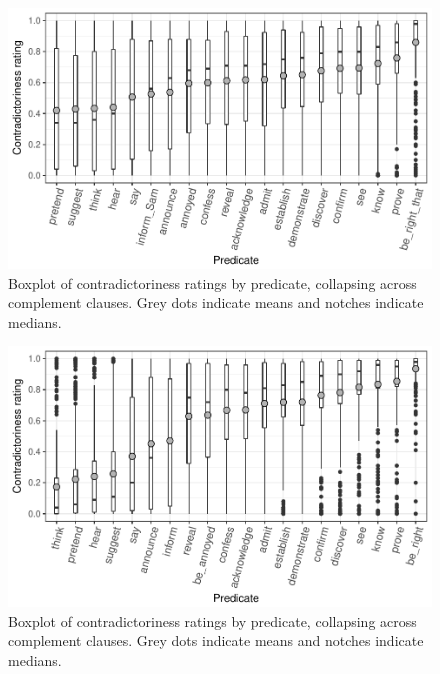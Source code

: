 \documentclass[11pt,fleqn]{article}
\newcommand{\6}{\mbox{$[\hspace*{-.6mm}[$}}
\newcommand{\9}{\mbox{$]\hspace*{-.6mm}]$}}
\begin{document}
\begin{figure}[h!]
\centering

\includegraphics[width=.8\paperwidth]{../results/2-veridicality/graphs/boxplot-veridicality}

\caption{Boxplot of contradictoriness ratings by predicate, collapsing across complement clauses. Grey dots indicate means and notches indicate medians.}
\label{f-veridicality-predicate}
\end{figure}

\begin{figure}[h!]
\centering

\includegraphics[width=.8\paperwidth]{../results/2-veridicality2/graphs/boxplot-veridicality}

\caption{Boxplot of contradictoriness ratings by predicate, collapsing across complement clauses. Grey dots indicate means and notches indicate medians.}
\label{f-veridicality-predicate}
\end{figure}
\end{document}
